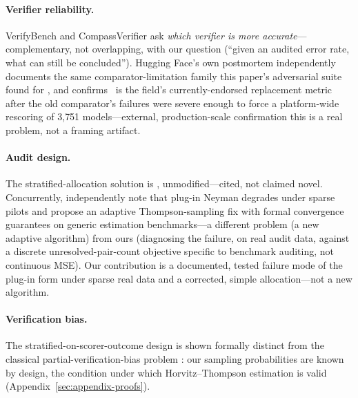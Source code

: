 \paragraph{Verifier reliability.} VerifyBench \citep{li2025verifybench} and
CompassVerifier \citep{liu2025compassverifier} ask \emph{which verifier is
more accurate}---complementary, not overlapping, with our question (``given
an audited error rate, what can still be concluded''). Hugging Face's own
postmortem \citep{kydlicek2025fixing} independently documents the same
comparator-limitation family this paper's adversarial suite found for
\scoreboxed, and confirms \exactmatch\ is the field's currently-endorsed
replacement metric after the old comparator's failures were severe enough
to force a platform-wide rescoring of 3{,}751 models---external,
production-scale confirmation this is a real problem, not a framing
artifact.

\paragraph{Audit design.} The stratified-allocation solution is
\citet{neyman1934stratified}, unmodified---cited, not claimed novel.
Concurrently, \citet{morikawa2026tsneyman} independently note that
plug-in Neyman degrades under sparse pilots and propose an adaptive
Thompson-sampling fix with formal convergence guarantees on generic
estimation benchmarks---a different problem (a new adaptive algorithm)
from ours (diagnosing the failure, on real audit data, against a discrete
unresolved-pair-count objective specific to benchmark auditing, not
continuous MSE). Our contribution is a documented, tested failure mode of
the plug-in form under sparse real data and a corrected, simple
allocation---not a new algorithm.

\paragraph{Verification bias.} The stratified-on-scorer-outcome design is
shown formally distinct from the classical partial-verification-bias
problem \citep{begg1983assessment}: our sampling probabilities are known by
design, the condition under which Horvitz--Thompson estimation
\citep{horvitz1952generalization} is valid (Appendix~\ref{sec:appendix-proofs}).
